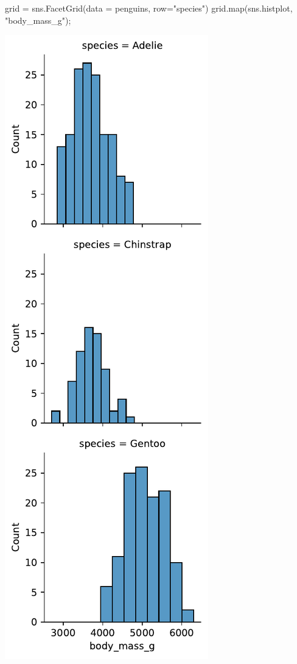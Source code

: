 \documentclass[
  a4paper,
  noprof,
  12pt,
  notoc,
  nosols,
  nobib]{mnye}
\newenvironment{Shaded}{\begin{snugshade}}{\end{snugshade}}
\newcommand{\BuiltInTok}[1]{\textcolor[rgb]{0.00,0.23,0.31}{#1}}
\newcommand{\NormalTok}[1]{\textcolor[rgb]{0.00,0.23,0.31}{#1}}
\newcommand{\OperatorTok}[1]{\textcolor[rgb]{0.37,0.37,0.37}{#1}}
\newcommand{\StringTok}[1]{\textcolor[rgb]{0.13,0.47,0.30}{#1}}
\theoremstyle{definition}
\theoremstyle{remark}
\begin{document}
\begin{Shaded}
\begin{Highlighting}[]
\NormalTok{grid }\OperatorTok{=}\NormalTok{ sns.FacetGrid(data }\OperatorTok{=}\NormalTok{ penguins, row}\OperatorTok{=}\StringTok{"species"}\NormalTok{)}
\NormalTok{grid.}\BuiltInTok{map}\NormalTok{(sns.histplot, }\StringTok{"body\_mass\_g"}\NormalTok{)}\OperatorTok{;}
\end{Highlighting}
\end{Shaded}

\includegraphics{chapters/numerical_by_categorical_files/figure-pdf/cell-9-output-1.pdf}
\end{document}

